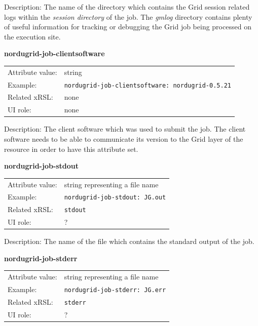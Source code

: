 \documentclass{article}
\begin{document}
Description: The name of the directory which contains the Grid session related logs
within the {\it session directory} of the job.
The {\it gmlog} directory contains plenty of useful information for tracking or debugging
the Grid job being processed on the execution site.


  \hspace*{0.5cm}
  \begin{shaded}
    \textbf{nordugrid-job-clientsoftware}
  \end{shaded}
  \begin{tabular}{lp{10cm}}  
    Attribute value:& string\\
    Example:& \verb#nordugrid-job-clientsoftware: nordugrid-0.5.21#\\
    Related xRSL:& none\\
    UI role:& none\\
  \end{tabular}

Description:  The client software which was used to submit the job.
The client software needs to be able to communicate its version to the Grid
layer of the resource in order to have this attribute set.



  \hspace*{0.5cm}
  \begin{shaded}
    \textbf{nordugrid-job-stdout}
  \end{shaded}
  \begin{tabular}{lp{10cm}}  
    Attribute value:& string representing a file name\\
    Example:& \verb#nordugrid-job-stdout: JG.out#\\
    Related xRSL:& \verb#stdout#\\
    UI role:& ?\\
  \end{tabular}

Description: The name of the file which contains the standard output
of the job.


  \hspace*{0.5cm}
  \begin{shaded}
    \textbf{nordugrid-job-stderr}
  \end{shaded}
  \begin{tabular}{lp{10cm}}  
    Attribute value:& string representing a file name\\
    Example:& \verb#nordugrid-job-stderr: JG.err#\\
    Related xRSL:& \verb#stderr#\\
    UI role:& ?\\
  \end{tabular}
\end{document}
